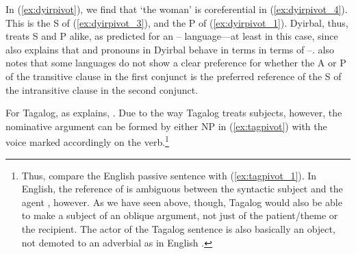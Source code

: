 In (\ref{ex:dyirpivot}), we find that  `the woman' is
coreferential in (\ref{ex:dyirpivot_4}). This is the S of
(\ref{ex:dyirpivot_3}), and the P of (\ref{ex:dyirpivot_1}). Dyirbal, thus,
treats S and P alike, as predicted for an \Erg{}--\Abs{} language---at least in
this case, since \citet[113]{comrie1989} also explains that \Fsg{} and \Ssg{}
pronouns in Dyirbal behave in terms in terms of \Nom{}--\Acc{}.
\citet{comrie1989} also notes that some languages do not show a clear
preference for whether the A or P of the transitive clause in the first
conjunct is the preferred reference of the S of the intransitive clause in the
second conjunct.

For Tagalog, as \citet{kroeger1991} explains, . Due to the way
Tagalog treats subjects, however, the nominative argument can be formed by
either NP in (\ref{ex:tagpivot}) with the voice marked accordingly on the
verb.\footnote{Thus, compare the English passive sentence  with (\ref{ex:tagpivot_1}). In English,
the reference of  is ambiguous between the syntactic subject 
and the agent , however. As we have seen above, though, Tagalog would
also be able to make a subject of an oblique argument, not just of the
patient/theme or the recipient. The actor of the Tagalog sentence is also
basically an object, not demoted to an adverbial as in English
\citep[38--44]{kroeger1991}.}

